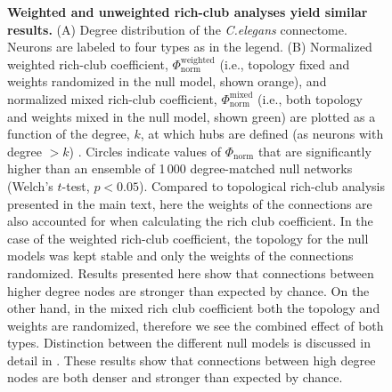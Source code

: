 \begin{figure}[h!]
 \caption{{\bf Weighted and unweighted rich-club analyses yield similar results.}
   (A) Degree distribution of the \emph{C.elegans} connectome.
    Neurons are labeled to four types as in the legend.
    (B)
    Normalized weighted rich-club coefficient, $\Phi_\mathrm{norm}^\mathrm{weighted}$ (i.e., topology fixed and weights randomized in the null model, shown orange), and
    normalized mixed rich-club coefficient, $\Phi_\mathrm{norm}^\mathrm{mixed}$ (i.e., both topology and weights mixed in the null model, shown green) are plotted as a function of the degree, $k$, at which hubs are defined (as neurons with degree $>k$) \citep{Alstott2014}.
    Circles indicate values of $\Phi_\mathrm{norm}$ that are significantly higher than an ensemble of 1\,000 degree-matched null networks (Welch's $t$-test, $p < 0.05$).
    Compared to topological rich-club analysis presented in the main text, here the weights of the connections are also accounted for when calculating the rich club coefficient.
    In the case of the weighted rich-club coefficient, the topology for the null models was kept stable and only the weights of the connections randomized. Results presented here show that connections between higher degree nodes are stronger than expected by chance.
    On the other hand, in the mixed rich club coefficient both the topology and weights are randomized, therefore we see the combined effect of both types.
    Distinction between the different null models is discussed in detail in \citep{Alstott2014}.
    These results show that connections between high degree nodes are both denser and stronger than expected by chance.}
\label{fig:Ch2S5_Fig}
\end{figure}


